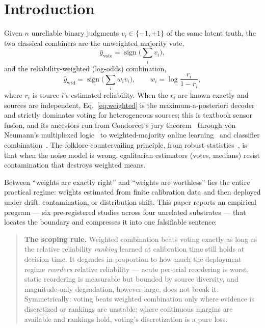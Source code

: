 \documentclass[aps,prapplied,preprint,amsmath,amssymb,floatfix]{revtex4-2}
\begin{document}
\maketitle

\section{Introduction}

Given $n$ unreliable binary judgments $v_i\in\{-1,+1\}$ of the same
latent truth, the two classical combiners are the unweighted majority
vote,
\begin{equation}
\hat y_{\mathrm{vote}}=\operatorname{sign}\Big(\sum_i v_i\Big),
\end{equation}
and the reliability-weighted (log-odds) combination,
\begin{equation}
\hat y_{\mathrm{wtd}}=\operatorname{sign}\Big(\sum_i w_i v_i\Big),\qquad
w_i=\log\frac{r_i}{1-r_i},
\label{eq:weighted}
\end{equation}
where $r_i$ is source $i$'s estimated reliability. When the $r_i$ are
known exactly and sources are independent, Eq.~\eqref{eq:weighted} is the
maximum-a-posteriori decoder and strictly dominates voting for
heterogeneous sources; this is textbook sensor fusion, and its ancestors
run from Condorcet's jury theorem~\cite{condorcet1785} through von
Neumann's multiplexed logic~\cite{vonneumann1956} to weighted-majority
online learning~\cite{littlestone1994} and classifier
combination~\cite{kittler1998,dietterich2000}. The folklore countervailing
principle, from robust statistics~\cite{huber1964}, is that when the
noise model is wrong, egalitarian estimators (votes, medians) resist
contamination that destroys weighted means.

Between ``weights are exactly right'' and ``weights are worthless'' lies
the entire practical regime: weights estimated from finite calibration
data and then deployed under drift, contamination, or distribution shift.
This paper reports an empirical program --- six pre-registered studies
across four unrelated substrates --- that locates the boundary and
compresses it into one falsifiable sentence:

\begin{quote}
\textbf{The scoping rule.} Weighted combination beats voting exactly as
long as the relative reliability \emph{ranking} learned at calibration
time still holds at decision time. It degrades in proportion to how much
the deployment regime \emph{reorders} relative reliability --- acute
per-trial reordering is worst, static reordering is measurable but
bounded by source diversity, and magnitude-only degradation, however
large, does not break it. Symmetrically: voting beats weighted
combination only where evidence is discretized or rankings are unstable;
where continuous margins are available and rankings hold, voting's
discretization is a pure loss.
\end{quote}
\end{document}
